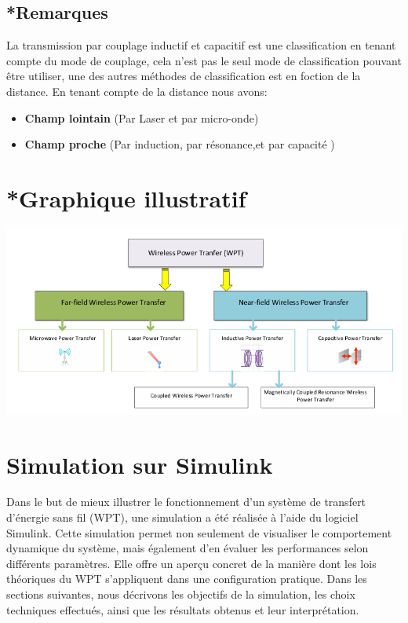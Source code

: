 \documentclass[12pt,a4paper,titlepage,notitlepage]{article}
\begin{document}
	
	\subsection*{*Remarques}
	La transmission par couplage inductif et capacitif est une classification en tenant compte du mode de couplage, cela n'est pas le seul mode de  classification pouvant être utiliser, une des autres méthodes de classification est en foction de la distance. En tenant compte de la distance nous avons:
	\begin{itemize}
		\item \textbf{Champ lointain} (Par Laser et par micro-onde)
		\item \textbf{Champ proche} (Par induction, par résonance,et par capacité )
	\end{itemize}

	\section*{*Graphique illustratif}
	\includegraphics[width=1.1\textwidth]{classification_WPT}
	
	
	
	
	
	\section{Simulation sur Simulink}
	
	Dans le but de mieux illustrer le fonctionnement d’un système de transfert d’énergie sans fil (WPT), une simulation a été réalisée à l’aide du logiciel Simulink. Cette simulation permet non seulement de visualiser le comportement dynamique du système, mais également d’en évaluer les performances selon différents paramètres. Elle offre un aperçu concret de la manière dont les lois théoriques du WPT s’appliquent dans une configuration pratique. Dans les sections suivantes, nous décrivons les objectifs de la simulation, les choix techniques effectués, ainsi que les résultats obtenus et leur interprétation.
	
\end{document}
